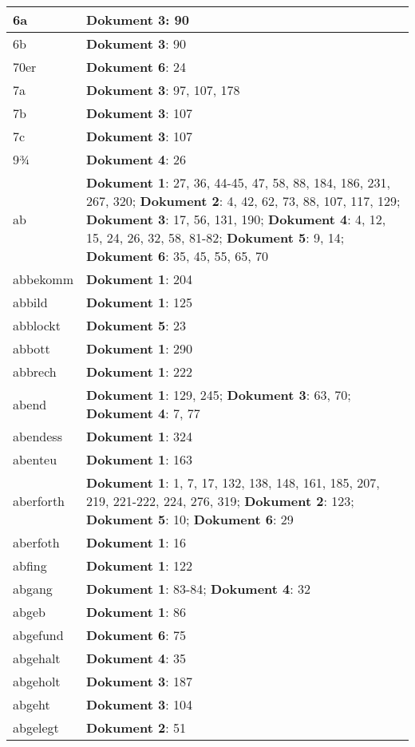 \documentclass[a5paper]{article}
\begin{document}
\begin{longtable}[l]{|l|p{3in}|}
\hline
6a & \textbf{Dokument 3}: 90 \\
\hline
6b & \textbf{Dokument 3}: 90 \\
\hline
70er & \textbf{Dokument 6}: 24 \\
\hline
7a & \textbf{Dokument 3}: 97, 107, 178 \\
\hline
7b & \textbf{Dokument 3}: 107 \\
\hline
7c & \textbf{Dokument 3}: 107 \\
\hline
9¾ & \textbf{Dokument 4}: 26 \\
\hline
ab & \textbf{Dokument 1}: 27, 36, 44-45, 47, 58, 88, 184, 186, 231, 267, 320; \textbf{Dokument 2}: 4, 42, 62, 73, 88, 107, 117, 129; \textbf{Dokument 3}: 17, 56, 131, 190; \textbf{Dokument 4}: 4, 12, 15, 24, 26, 32, 58, 81-82; \textbf{Dokument 5}: 9, 14; \textbf{Dokument 6}: 35, 45, 55, 65, 70 \\
\hline
abbekomm & \textbf{Dokument 1}: 204 \\
\hline
abbild & \textbf{Dokument 1}: 125 \\
\hline
abblockt & \textbf{Dokument 5}: 23 \\
\hline
abbott & \textbf{Dokument 1}: 290 \\
\hline
abbrech & \textbf{Dokument 1}: 222 \\
\hline
abend & \textbf{Dokument 1}: 129, 245; \textbf{Dokument 3}: 63, 70; \textbf{Dokument 4}: 7, 77 \\
\hline
abendess & \textbf{Dokument 1}: 324 \\
\hline
abenteu & \textbf{Dokument 1}: 163 \\
\hline
aberforth & \textbf{Dokument 1}: 1, 7, 17, 132, 138, 148, 161, 185, 207, 219, 221-222, 224, 276, 319; \textbf{Dokument 2}: 123; \textbf{Dokument 5}: 10; \textbf{Dokument 6}: 29 \\
\hline
aberfoth & \textbf{Dokument 1}: 16 \\
\hline
abfing & \textbf{Dokument 1}: 122 \\
\hline
abgang & \textbf{Dokument 1}: 83-84; \textbf{Dokument 4}: 32 \\
\hline
abgeb & \textbf{Dokument 1}: 86 \\
\hline
abgefund & \textbf{Dokument 6}: 75 \\
\hline
abgehalt & \textbf{Dokument 4}: 35 \\
\hline
abgeholt & \textbf{Dokument 3}: 187 \\
\hline
abgeht & \textbf{Dokument 3}: 104 \\
\hline
abgelegt & \textbf{Dokument 2}: 51 \\

\end{longtable}
\end{document}
